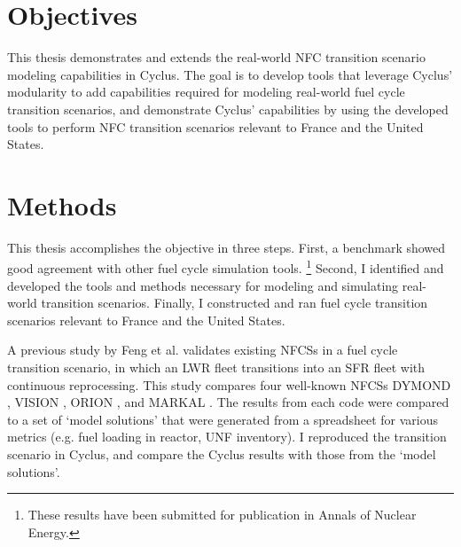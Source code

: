 \section{Objectives}

This thesis demonstrates and extends the real-world \gls{NFC} transition
scenario modeling capabilities in Cyclus. The goal is to
develop tools that leverage Cyclus' modularity to
add capabilities required for modeling real-world
fuel cycle transition scenarios, and demonstrate Cyclus'
capabilities by using the developed tools to perform
\gls{NFC} transition scenarios relevant to France and the United
States.

\section{Methods}
This thesis accomplishes the objective in three steps. 
First, a benchmark showed good agreement with other
fuel cycle simulation tools. \footnote{These results have been
submitted for publication in Annals of Nuclear Energy.}
Second, I identified and developed the tools and methods necessary
for modeling and simulating real-world transition scenarios.
Finally, I constructed and ran fuel cycle transition scenarios
relevant to France and the United States.

A previous study by Feng et al. \cite{feng_standardized_2016} validates existing 
\glspl{NFCS} in a fuel cycle transition scenario, in which an \gls{LWR} fleet
transitions into an \gls{SFR} fleet with continuous reprocessing. This 
study compares four well-known \glspl{NFCS}
DYMOND \cite{yacout_modeling_2005},
VISION \cite{jacobson_verifiable_2010},
ORION \cite{gregg_analysis_2012}, and
MARKAL \cite{shay_epa_2006}. The results from each code were
compared to a set of `model solutions' that were generated
from a spreadsheet for various metrics (e.g. fuel loading
in reactor, \gls{UNF} inventory). I reproduced the transition
scenario in Cyclus, and compare the Cyclus results with those
from the `model solutions'.

